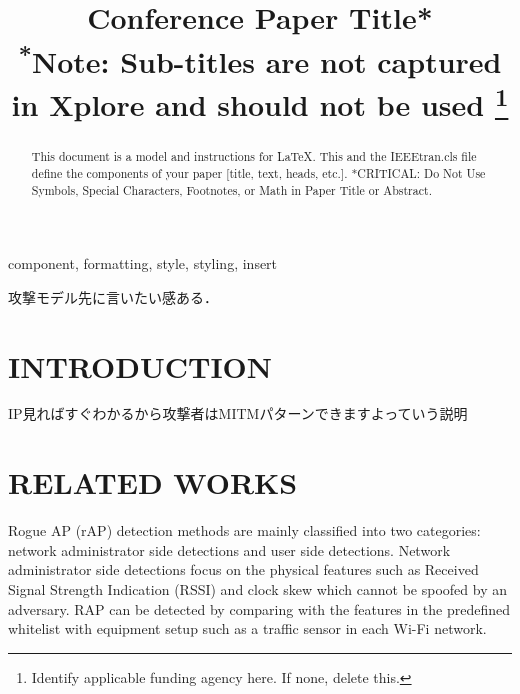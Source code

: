 \documentclass[conference]{IEEEtran}
\begin{document}
\title{Conference Paper Title*\\
{\footnotesize \textsuperscript{*}Note: Sub-titles are not captured in Xplore and
should not be used}
\thanks{Identify applicable funding agency here. If none, delete this.}
}

\author{
\and
{}
\and
{}
\and

}

\maketitle

\begin{abstract}
This document is a model and instructions for \LaTeX.
This and the IEEEtran.cls file define the components of your paper [title, text, heads, etc.]. *CRITICAL: Do Not Use Symbols, Special Characters, Footnotes, 
or Math in Paper Title or Abstract.
\end{abstract}

\begin{IEEEkeywords}
component, formatting, style, styling, insert
\end{IEEEkeywords}
 攻撃モデル先に言いたい感ある．
\section{INTRODUCTION}
IP見ればすぐわかるから攻撃者はMITMパターンできますよっていう説明
\section{RELATED WORKS}
Rogue AP (rAP) detection methods are mainly classified into two categories: network administrator side detections and user side detections.
Network administrator side detections focus on the physical features such as Received Signal Strength Indication (RSSI) and clock skew which cannot be spoofed by an adversary.
RAP can be detected by comparing with the features in the predefined whitelist with equipment setup such as a traffic sensor in each Wi-Fi network.
\end{document}
